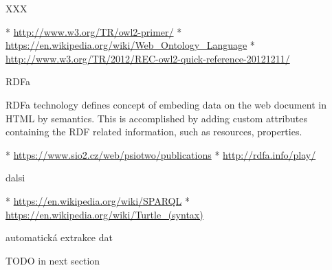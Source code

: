 XXX

\begitems
 * \url{http://www.w3.org/TR/owl2-primer/}
 * \url{https://en.wikipedia.org/wiki/Web_Ontology_Language}
 * \url{http://www.w3.org/TR/2012/REC-owl2-quick-reference-20121211/}
\enditems


%


\sec RDFa

RDFa technology defines concept of embeding data on the web document in HTML by
semantics. This is accomplished by adding custom attributes containing the RDF
related information, such as resources, properties. 

\begitems
 * \url{https://www.sio2.cz/web/psiotwo/publications}
 * \url{http://rdfa.info/play/}
\enditems


\sec dalsi

\begitems
 * \url{https://en.wikipedia.org/wiki/SPARQL}
 * \url{https://en.wikipedia.org/wiki/Turtle_(syntax)}
\enditems



\sec automatická extrakce dat

TODO in next section

